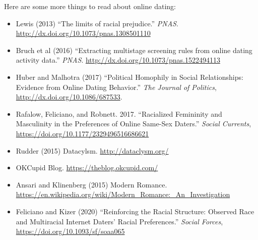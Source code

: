 \documentclass[aspectratio=169]{beamer}
\begin{document}
\begin{frame}

Here are some more things to read about online dating:
\begin{itemize}
\item Lewis (2013) ``The limits of racial prejudice.'' \textit{PNAS}. \url{http://dx.doi.org/10.1073/pnas.1308501110}
\item Bruch et al (2016) ``Extracting multistage screening rules from online dating activity data.'' \textit{PNAS}. \url{http://dx.doi.org/10.1073/pnas.1522494113}
\item Huber and Malhotra (2017) ``Political Homophily in Social Relationships: Evidence from Online Dating Behavior.'' \textit{The Journal of Politics}, \url{http://dx.doi.org/10.1086/687533}.
\item Rafalow, Feliciano, and Robnett. 2017. ``Racialized Femininity and Masculinity in the Preferences of Online Same-Sex Daters.'' \textit{Social Currents}, \url{https://doi.org/10.1177/2329496516686621}
\item Rudder (2015) Datacylsm. \url{http://dataclysm.org/}
\item OKCupid Blog. \url{https://theblog.okcupid.com/}
\item Ansari and Klinenberg (2015) Modern Romance. \url{https://en.wikipedia.org/wiki/Modern_Romance:_An_Investigation}
\item Feliciano and Kizer (2020) ``Reinforcing the Racial Structure: Observed Race and Multiracial Internet Daters' Racial Preferences.'' \textit{Social Forces}, \url{https://doi.org/10.1093/sf/soaa065}
\end{itemize}

\end{frame}
\end{document}
